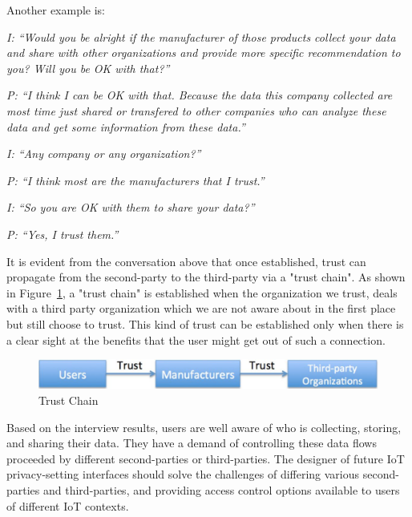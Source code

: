 Another example is:

\textit{I: ``Would you be alright if the manufacturer of those products collect your data and share with other organizations and provide more specific recommendation to you? Will you be OK with that?''\\}

\textit{P: ``I think I can be OK with that. Because the data this company collected are most time just shared or transfered to other companies who can analyze these data and get some information from these data.''\\}

\textit{I: ``Any company or any organization?''\\}

\textit{P: ``I think most are the manufacturers that I trust.''\\}

\textit{I: ``So you are OK with them to share your data?''\\}

\textit{P: ``Yes, I trust them.''\\}

It is evident from the conversation above that once established, trust can propagate from the second-party to the third-party via a "trust chain". As shown in Figure~\ref{fig:trustchain}, a "trust chain" is established when the organization we trust, deals with a third party organization which we are not aware about in the first place but still choose to trust. This kind of trust can be established only when there is a clear sight at the benefits that the user might get out of such a connection.

\begin{figure}
	\centering
	\includegraphics[width=0.75\columnwidth]{figures/trustchain.pdf}
	\caption{Trust Chain}
	\label{fig:trustchain}
\end{figure}

Based on the interview results, users are well aware of who is collecting, storing, and sharing their data. They have a demand of controlling these data flows proceeded by different second-parties or third-parties. The designer of future IoT privacy-setting interfaces should solve the challenges of differing various second-parties and third-parties, and providing access control options available to users of different IoT contexts.

